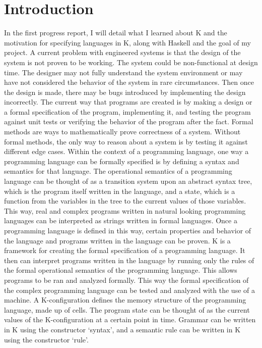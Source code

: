 \chapter{Introduction}
In the first progress report, I will detail what I learned about K and the motivation for specifying languages in K, along with Haskell and the goal of my project.
A current problem with engineered systems is that the design of the system is not proven to be working. The system could be non-functional at design time. The designer may not fully understand the system environment or may have not considered the behavior of the system in rare circumstances. Then once the design is made, there may be bugs introduced by implementing the design incorrectly.
The current way that programs are created is by making a design or a formal specification of the program, implementing it, and testing the program against unit tests or verifying the behavior of the program after the fact.
Formal methods are ways to mathematically prove correctness of a system. Without formal methods, the only way to reason about a system is by testing it against different edge cases.
Within the context of a programming language, one way a programming language can be formally specified is by defining a syntax and semantics for that language.
The operational semantics of a programming language can be thought of as a transition system upon an abstract syntax tree, which is the program itself written in the language, and a state, which is a function from the variables in the tree to the current values of those variables. 
This way, real and complex programs written in natural looking programming languages can be interpreted as strings written in formal languages. Once a programming language is defined in this way, certain properties and behavior of the language and programs written in the language can be proven.
K is a framework for creating the formal specification of a programming language. It then can interpret programs written in the language by running only the rules of the formal operational semantics of the programming language. This allows programs to be ran and analyzed formally. This way the formal specification of the complex programming language can be tested and analyzed with the use of a machine.
A K-configuration defines the memory structure of the programming language, made up of cells. The program state can be thought of as the current values of the K-configuration at a certain point in time.
Grammar can be written in K using the constructor ‘syntax’, and a semantic rule can be written in K using the constructor ‘rule’.
